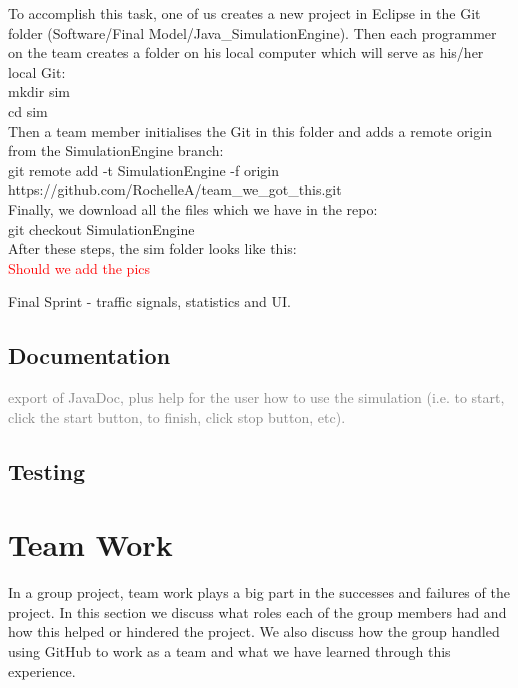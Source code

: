 \documentclass{article}
\begin{document}
\noindent
To accomplish this task, one of us creates a new project in Eclipse in the Git folder (Software/Final Model/Java\_SimulationEngine). 
Then each programmer on the team creates a folder on his local computer which will serve as his/her local Git:\\

mkdir sim\\

cd sim\\

\noindent
Then a team member initialises the Git in this folder and adds a remote origin from the SimulationEngine branch:\\

\noindent
git remote add -t SimulationEngine -f origin https://github.com/RochelleA/team\_we\_got\_this.git\\

\noindent
Finally, we download all the files which we have in the repo:\\

\noindent
git checkout SimulationEngine\\

\noindent
After these steps, the sim folder looks like this: \\
\textcolor{red}{Should we add the pics}

Final Sprint - traffic signals, statistics and UI. 

	\subsection{Documentation}
		\textcolor{gray}{export of JavaDoc, plus help for the user how to use the simulation (i.e. to start, click the start button, to finish, click stop button, etc).}
		
		
	\subsection{Testing}

\section{Team Work}
In a group project, team work plays a big part in the successes and failures of the project. In this section we discuss what roles each of the group members had and how this helped or hindered the project. We also discuss how the group handled using GitHub to work as a team and what we have learned through this experience. 
\end{document}
